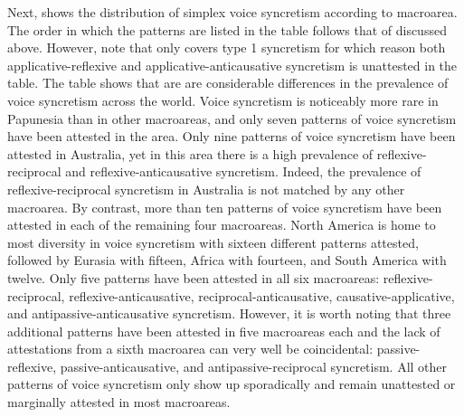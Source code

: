Next,  shows the distribution of simplex voice syncretism according to macroarea. The order in which the patterns are listed in the table follows that of  discussed above. However, note that  only covers type 1 syncretism for which reason both applicative-reflexive and applicative-anticausative syncretism is unattested in the table. The table shows that are are considerable differences in the prevalence of voice syncretism across the world. Voice syncretism is noticeably more rare in Papunesia than in other macroareas, and only seven patterns of voice syncretism have been attested in the area. Only nine patterns of voice syncretism have been attested in Australia, yet in this area there is a high prevalence of reflexive-reciprocal and reflexive-anticausative syncretism. Indeed, the prevalence of reflexive-reciprocal syncretism in Australia is not matched by any other macroarea. By contrast, more than ten patterns of voice syncretism have been attested in each of the remaining four macroareas. North America is home to most diversity in voice syncretism with sixteen different patterns attested, followed by Eurasia with fifteen, Africa with fourteen, and South America with twelve. Only five patterns have been attested in all six macroareas: reflexive-reciprocal, reflexive-anticausative, reciprocal-anticausative, causative-applicative, and antipassive-anticausative syncretism. However, it is worth noting that three additional patterns have been attested in five macroareas each and the lack of attestations from a sixth macroarea can very well be coincidental: passive-reflexive, passive-anticausative, and antipassive-reciprocal syncretism. All other patterns of voice syncretism only show up sporadically and remain unattested or marginally attested in most macroareas.  

